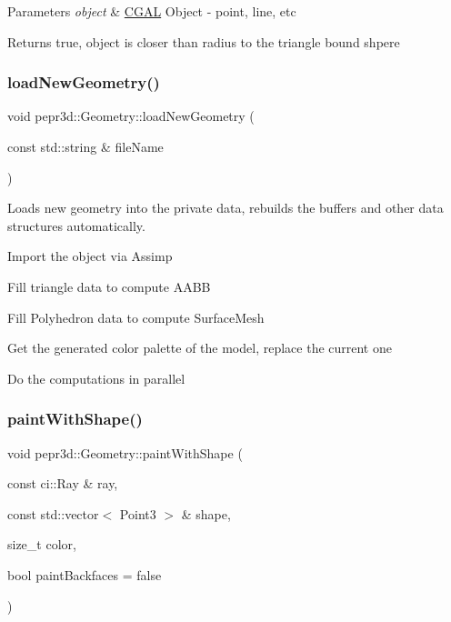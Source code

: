 \begin{DoxyParams}{Parameters}
{\em object} & \mbox{\hyperlink{namespace_c_g_a_l}{C\+G\+AL}} Object -\/ point, line, etc \\
\hline
\end{DoxyParams}
\begin{DoxyReturn}{Returns}
true, object is closer than radius to the triangle bound shpere 
\end{DoxyReturn}
\mbox{\label{classpepr3d_1_1_geometry_a027715ec109b060ffc8b420947c4fde0}} 
\subsubsection{\texorpdfstring{loadNewGeometry()}{loadNewGeometry()}}
{\footnotesize\ttfamily void pepr3d\+::\+Geometry\+::load\+New\+Geometry (\begin{DoxyParamCaption}\item[{const std\+::string \&}]{file\+Name }\end{DoxyParamCaption})}



Loads new geometry into the private data, rebuilds the buffers and other data structures automatically. 

Import the object via Assimp

Fill triangle data to compute A\+A\+BB

Fill Polyhedron data to compute Surface\+Mesh

Get the generated color palette of the model, replace the current one

Do the computations in parallel \mbox{\label{classpepr3d_1_1_geometry_a6c6b8ef6f157f8bb818e38f6e2e49b37}} 
\subsubsection{\texorpdfstring{paintWithShape()}{paintWithShape()}\hspace{0.1cm}{\footnotesize\ttfamily [1/2]}}
{\footnotesize\ttfamily void pepr3d\+::\+Geometry\+::paint\+With\+Shape (\begin{DoxyParamCaption}\item[{const ci\+::\+Ray \&}]{ray,  }\item[{const std\+::vector$<$ Point3 $>$ \&}]{shape,  }\item[{size\+\_\+t}]{color,  }\item[{bool}]{paint\+Backfaces = {\ttfamily false} }\end{DoxyParamCaption})}



